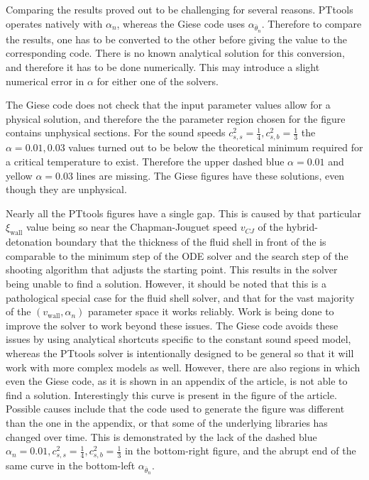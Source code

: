 Comparing the results proved out to be challenging for several reasons.
PTtools operates natively with $\alpha_n$, whereas the Giese code uses $\alpha_{\bar{\theta}_n}$.
Therefore to compare the results, one has to be converted to the other before giving the value to the corresponding code.
There is no known analytical solution for this conversion, and therefore it has to be done numerically.
This may introduce a slight numerical error in $\alpha$ for either one of the solvers.

The Giese code does not check that the input parameter values allow for a physical solution,
and therefore the the parameter region chosen for the figure contains unphysical sections.
For the sound speeds $c_{s,s}^2 = \frac{1}{4}, c_{s,b}^2 = \frac{1}{3}$ the $\alpha = 0.01, 0.03$ values turned out to be below the theoretical minimum
required for a critical temperature to exist.
Therefore the upper dashed blue $\alpha = 0.01$ and yellow $\alpha = 0.03$ lines are missing.
The Giese figures have these solutions, even though they are unphysical.

Nearly all the PTtools figures have a single gap.
This is caused by that particular $\xi_\text{wall}$ value being so near the Chapman-Jouguet speed $v_{CJ}$ of the hybrid-detonation boundary
that the thickness of the fluid shell in front of the is comparable to the minimum step of the ODE solver
and the search step of the shooting algorithm that adjusts the starting point.
This results in the solver being unable to find a solution.
However, it should be noted that this is a pathological special case for the fluid shell solver,
and that for the vast majority of the $(v_\text{wall}, \alpha_n)$ parameter space it works reliably.
Work is being done to improve the solver to work beyond these issues.
The Giese code avoids these issues by using analytical shortcuts specific to the constant sound speed model,
whereas the PTtools solver is intentionally designed to be general so that it will work with more complex models as well.
However, there are also regions in which even the Giese code, as it is shown in an appendix of the article, is not able to find a solution.
Interestingly this curve is present in the figure of the article.
Possible causes include that the code used to generate the figure was different than the one in the appendix,
or that some of the underlying libraries has changed over time.
This is demonstrated by the lack of the dashed blue $\alpha_n = 0.01, c_{s,s}^2 = \frac{1}{4}, c_{s,b}^2 = \frac{1}{3}$ in the bottom-right figure,
and the abrupt end of the same curve in the bottom-left $\alpha_{\bar{\theta}_n}$.

